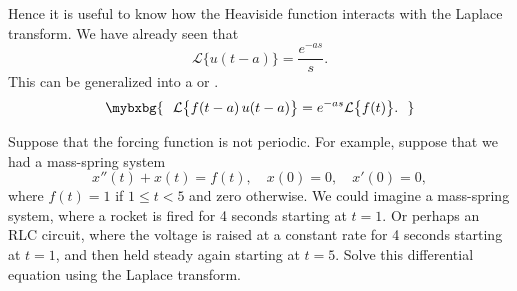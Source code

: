 Hence it is 
useful to know how the Heaviside function interacts with the Laplace
transform.  We have already seen that
\begin{equation*}
\mathcal{L} \bigl\{ u(t-a) \bigr\} = \frac{e^{-as}}{s} .
\end{equation*}
This can be generalized into a \emph{}
or \emph{}.
\begin{equation} \label{ltd:sseq}
\mybxbg{~~
\mathcal{L} \bigl\{ f(t-a) \, u(t-a) \bigr\}
= e^{-as} \mathcal{L} \bigl\{ f(t) \bigr\} .
~~}
\end{equation}

\begin{example} \label{lt:rocketex}
Suppose that the forcing function is not periodic.  For example,
suppose that we had a mass-spring system
\begin{equation*}
x''(t) + x(t) = f(t) , \quad x(0) = 0, \quad x'(0) = 0,
\end{equation*}
where $f(t) = 1$ if $1 \leq t < 5$ and zero otherwise.  We could imagine a
mass-spring system, where a rocket is fired for 4 seconds starting at
$t=1$.  Or perhaps an RLC circuit, where the voltage is raised
at a constant rate for 4 seconds starting at $t=1$, and then held steady 
again
starting at $t=5$. Solve this differential equation using the Laplace transform.
\end{example}

